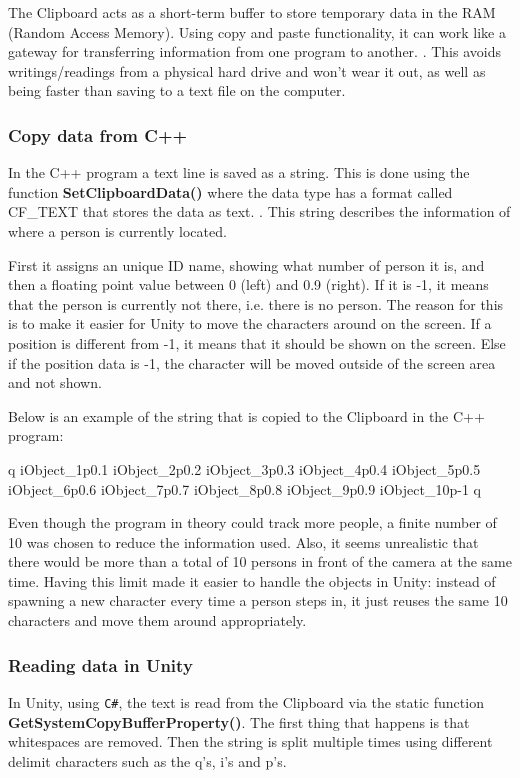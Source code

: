 The Clipboard acts as a short-term buffer to store temporary data in the RAM (Random Access Memory). Using copy and paste functionality, it can work like a gateway for transferring information from one program to another. \citep{clipboard1}. This avoids writings/readings from a physical hard drive and won't wear it out, as well as being faster than saving to a text file on the computer.

\subsubsection{Copy data from C++}
In the C++ program a text line is saved as a string. This is done using the function \textbf{SetClipboardData()} where the data type has a format called CF\_TEXT that stores the data as text.\citep{clipboard2} \citep{clipboard3}. This string describes the information of where a person is currently located.

First it assigns an unique ID name, showing what number of person it is, and then a floating point value between 0 (left) and 0.9 (right). If it is -1, it means that the person is currently not there, i.e. there is no person. The reason for this is to make it easier for Unity to move the characters around on the screen. If a position is different from -1, it means that it should be shown on the screen. Else if the position data is -1, the character will be moved outside of the screen area and not shown.

Below is an example of the string that is copied to the Clipboard in the C++ program:

q iObject\_1p0.1 iObject\_2p0.2 iObject\_3p0.3 iObject\_4p0.4 iObject\_5p0.5 iObject\_6p0.6 iObject\_7p0.7 iObject\_8p0.8 iObject\_9p0.9 iObject\_10p-1 q

Even though the program in theory could track more people, a finite number of 10 was chosen to reduce the information used. Also, it seems unrealistic that there would be more than a total of 10 persons in front of the camera at the same time. Having this limit made it easier to handle the objects in Unity: instead of spawning a new character every time a person steps in, it just reuses the same 10 characters and move them around appropriately.

\subsubsection{Reading data in Unity}
In Unity, using \texttt{C\#}, the text is read from the Clipboard via the static function \textbf{GetSystemCopyBufferProperty()}. The first thing that happens is that whitespaces are removed. Then the string is split multiple times using different delimit characters such as the q's, i's and p's.

